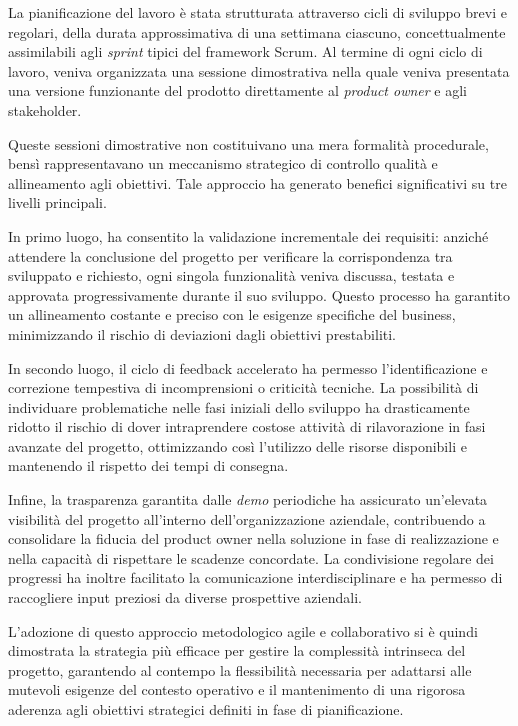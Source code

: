\documentclass[12pt,a4paper,openright,twoside]{book}
\begin{document}
La pianificazione del lavoro è stata strutturata attraverso cicli di sviluppo brevi e regolari, della durata approssimativa di una settimana ciascuno, concettualmente assimilabili agli \textit{sprint} tipici del framework Scrum. Al termine di ogni ciclo di lavoro, veniva organizzata una sessione dimostrativa nella quale veniva presentata una versione funzionante del prodotto direttamente al \textit{product owner} e agli stakeholder.

Queste sessioni dimostrative non costituivano una mera formalità procedurale, bensì rappresentavano un meccanismo strategico di controllo qualità e allineamento agli obiettivi. Tale approccio ha generato benefici significativi su tre livelli principali.

In primo luogo, ha consentito la validazione incrementale dei requisiti: anziché attendere la conclusione del progetto per verificare la corrispondenza tra sviluppato e richiesto, ogni singola funzionalità veniva discussa, testata e approvata progressivamente durante il suo sviluppo. Questo processo ha garantito un allineamento costante e preciso con le esigenze specifiche del business, minimizzando il rischio di deviazioni dagli obiettivi prestabiliti.

In secondo luogo, il ciclo di feedback accelerato ha permesso l'identificazione e correzione tempestiva di incomprensioni o criticità tecniche. La possibilità di individuare problematiche nelle fasi iniziali dello sviluppo ha drasticamente ridotto il rischio di dover intraprendere costose attività di rilavorazione in fasi avanzate del progetto, ottimizzando così l'utilizzo delle risorse disponibili e mantenendo il rispetto dei tempi di consegna.

Infine, la trasparenza garantita dalle \textit{demo} periodiche ha assicurato un'elevata visibilità del progetto all'interno dell'organizzazione aziendale, contribuendo a consolidare la fiducia del product owner nella soluzione in fase di realizzazione e nella capacità di rispettare le scadenze concordate. La condivisione regolare dei progressi ha inoltre facilitato la comunicazione interdisciplinare e ha permesso di raccogliere input preziosi da diverse prospettive aziendali.

L'adozione di questo approccio metodologico agile e collaborativo si è quindi dimostrata la strategia più efficace per gestire la complessità intrinseca del progetto, garantendo al contempo la flessibilità necessaria per adattarsi alle mutevoli esigenze del contesto operativo e il mantenimento di una rigorosa aderenza agli obiettivi strategici definiti in fase di pianificazione.
\end{document}
